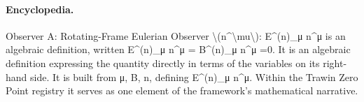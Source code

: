 \paragraph{Encyclopedia.}
Observer A: Rotating-Frame Eulerian Observer \textbackslash{}(n\textasciicircum{}\textbackslash{}mu\textbackslash{}): E\textasciicircum{}(n)\_μ n\textasciicircum{}μ is an algebraic definition, written E\textasciicircum{}(n)\_μ n\textasciicircum{}μ = B\textasciicircum{}(n)\_μ n\textasciicircum{}μ =0. It is an algebraic definition expressing the quantity directly in terms of the variables on its right-hand side. It is built from μ, B, n, defining E\textasciicircum{}(n)\_μ n\textasciicircum{}μ. Within the Trawin Zero Point registry it serves as one element of the framework's mathematical narrative.
